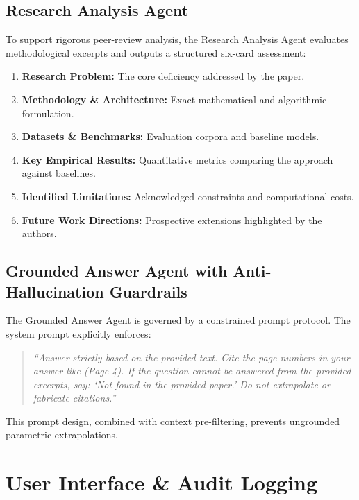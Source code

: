 \documentclass[conference]{IEEEtran}
\begin{document}
\subsection{Research Analysis Agent}
To support rigorous peer-review analysis, the Research Analysis Agent evaluates methodological excerpts and outputs a structured six-card assessment:
\begin{enumerate}
    \item \textbf{Research Problem:} The core deficiency addressed by the paper.
    \item \textbf{Methodology \& Architecture:} Exact mathematical and algorithmic formulation.
    \item \textbf{Datasets \& Benchmarks:} Evaluation corpora and baseline models.
    \item \textbf{Key Empirical Results:} Quantitative metrics comparing the approach against baselines.
    \item \textbf{Identified Limitations:} Acknowledged constraints and computational costs.
    \item \textbf{Future Work Directions:} Prospective extensions highlighted by the authors.
\end{enumerate}

\subsection{Grounded Answer Agent with Anti-Hallucination Guardrails}
The Grounded Answer Agent is governed by a constrained prompt protocol. The system prompt explicitly enforces:
\begin{quote}
\small\itshape
``Answer strictly based on the provided text. Cite the page numbers in your answer like (Page 4). If the question cannot be answered from the provided excerpts, say: `Not found in the provided paper.' Do not extrapolate or fabricate citations.''
\end{quote}
This prompt design, combined with context pre-filtering, prevents ungrounded parametric extrapolations.

\section{User Interface \& Audit Logging}
\end{document}
